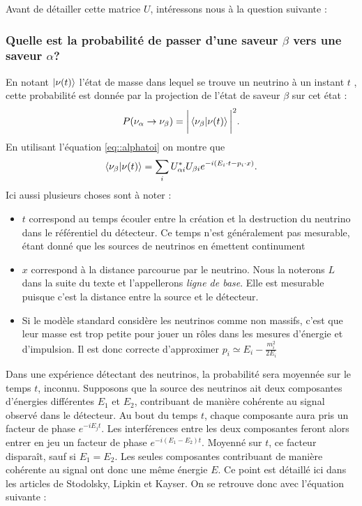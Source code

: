             Avant de détailler cette matrice $U$, intéressons nous à la question suivante : \\
            \subsubsection{Quelle est la probabilité de passer d'une saveur $\beta$ vers une saveur $\alpha$?}
            En notant $\ket{\nu(t)}$ l'état de masse dans lequel se trouve un neutrino à un instant $t$ , cette probabilité est donnée par la projection de l'état de saveur $\beta$ sur cet état :
            \begin{equation}
                P(\nu_{\alpha}\to\nu_{\beta})=\bigg|\braket{\nu_{\beta}}{\nu(t)}\bigg|^2.
            \end{equation}
            En utilisant l'équation \eqref{eq::alphatoi} on montre que
            \begin{equation}
                \braket{\nu_{\beta}}{\nu(t)} = \sum_i U_{\alpha i}^*U_{\beta i} e^{-i(E_i\cdot t - p_i\cdot x)}.
            \end{equation}
            Ici aussi plusieurs choses sont à noter : 
            \begin{itemize}
                \item $t$ correspond au temps écouler entre la création et la destruction du neutrino dans le référentiel du détecteur. Ce temps n'est généralement pas mesurable, étant donné que les sources de neutrinos en émettent continument
                \item $x$ correspond à la distance parcourue par le neutrino. Nous la noterons $L$ dans la suite du texte et l'appellerons \textit{ligne de base}. Elle est mesurable puisque c'est la distance entre la source et le détecteur.
                \item Si le modèle standard considère les neutrinos comme non massifs, c'est que leur masse est trop petite pour jouer un rôles dans les mesures d'énergie et d'impulsion. Il est donc correcte d'approximer $p_i \simeq E_i - \frac{m_i^2}{2E_i}$
            \end{itemize}
            Dans une expérience détectant des neutrinos, la probabilité sera moyennée sur le temps $t$, inconnu. Supposons que la source des neutrinos ait deux composantes d'énergies différentes $E_1$ et $E_2$, contribuant de manière cohérente au signal observé dans le détecteur. Au bout du temps $t$, chaque composante aura pris un facteur de phase $e^{-iE_jt}$. Les interférences entre les deux composantes feront alors entrer en jeu un facteur de phase $e^{-i(E_1-E_2)t}$. Moyenné sur $t$, ce facteur disparaît, sauf si $E_1 = E_2$. Les seules composantes contribuant de manière cohérente au signal ont donc une même énergie $E$. Ce point est détaillé ici dans les articles de Stodolsky\cite{Stodolsky1998}, Lipkin\cite{Lipkin2005} et Kayser\cite{Kayser2005}. On se retrouve donc avec l'équation suivante : 
